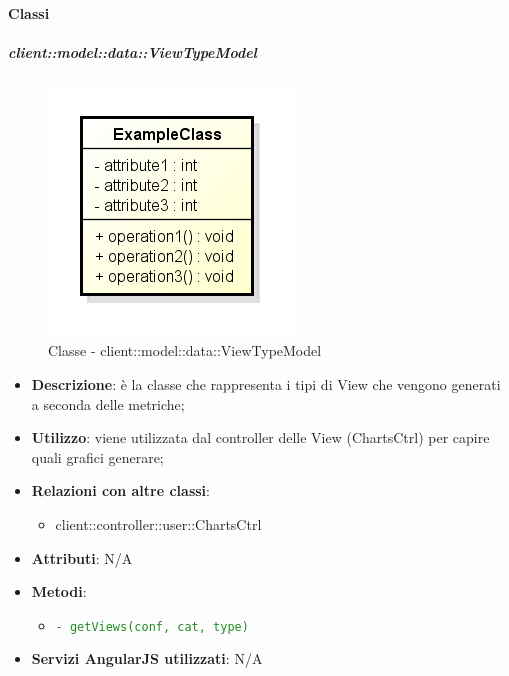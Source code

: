 	\paragraph{Classi} %
		\subparagraph{client::model::data::ViewTypeModel} %
		\label{subp:client_model_data_viewtypemodel}
			\begin{figure}[htbp]
				\centering
				\centerline{\includegraphics[scale=0.7]{./images/client/classes/example_class.png}}
				\caption{Classe - client::model::data::ViewTypeModel}
			\end{figure}
			\begin{itemize}
				\item \textbf{Descrizione}: è la classe che rappresenta i tipi di View che vengono generati a seconda delle metriche;
				\item \textbf{Utilizzo}: viene utilizzata dal controller delle View (ChartsCtrl) per capire quali grafici generare;
				\item \textbf{Relazioni con altre classi}:
					\begin{itemize}
						\item client::controller::user::ChartsCtrl
					\end{itemize}

				\item \textbf{Attributi}: N/A

				\item \textbf{Metodi}:
					\begin{itemize}
						\item \textcolor{forestgreen}{\texttt{- getViews(conf, cat, type)}}
					\end{itemize}

				\item \textbf{Servizi AngularJS utilizzati}: N/A

			\end{itemize}

